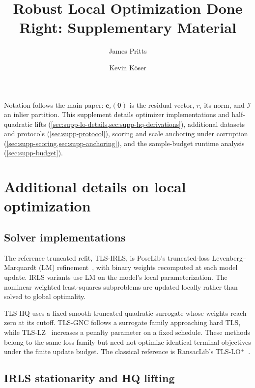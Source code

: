 \documentclass[runningheads]{llncs}
\newcommand{\cI}{\mathcal{I}}
\newcommand{\be}{\mathbf{e}}
\newcommand{\tlsirls}{TLS-IRLS}
\newcommand{\btheta}{\boldsymbol\theta}
\begin{document}
\title{Robust Local Optimization Done Right: Supplementary Material}
\author{James Pritts \and Kevin K\"oser}
\maketitle

\noindent
Notation follows the main paper: $\be_i(\btheta)$ is the residual vector,
$r_i$ its norm, and $\cI$ an inlier partition. This supplement details optimizer implementations
and half-quadratic lifts (\cref{sec:supp-lo-details,sec:supp-hq-derivations}),
additional datasets and protocols (\cref{sec:supp-protocol}), scoring and
scale anchoring under corruption (\cref{sec:supp-scoring,sec:supp-anchoring}),
and the sample-budget runtime analysis (\cref{sec:supp-budget}).

\section{Additional details on local optimization}
\label{sec:supp-lo-details}

\subsection{Solver implementations}

The reference truncated refit, \tlsirls{}, is PoseLib's
truncated-loss Levenberg--Marquardt (LM)
refinement~\cite{PoseLib}, with binary weights recomputed at each
model update. IRLS variants use LM on the model's local
parameterization. The nonlinear weighted least-squares subproblems
are updated locally rather than solved to global optimality.

TLS-HQ uses a fixed smooth truncated-quadratic surrogate whose
weights reach zero at its cutoff. TLS-GNC follows a surrogate
family approaching hard TLS, while TLS-LZ~\cite{LeZach2021}
increases a penalty parameter on a fixed schedule.
These methods belong to the same loss family but need not optimize
identical terminal objectives under the finite update budget.
The classical reference is RansacLib's
TLS-LO$^+$~\cite{Lebeda2012,Sattler2019Github}.

\subsection{IRLS stationarity and HQ lifting}
\end{document}
